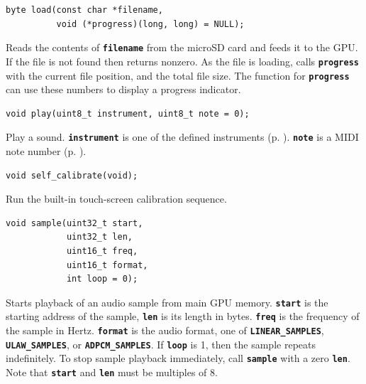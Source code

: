\documentclass[10pt]{book}
\newcommand{\mach}[1]{\texttt{\textbf{#1}}}
\begin{document}

\begin{framed}
\begin{verbatim}
byte load(const char *filename,
          void (*progress)(long, long) = NULL);
\end{verbatim}
\end{framed}

Reads the contents of \mach{filename} from the microSD card and
feeds it to the GPU.
If the file is not found then returns nonzero.
As the file is loading, calls \mach{progress} with the current file position,
and the total file size.
The function for \mach{progress} can use these numbers to display a progress indicator.


\begin{framed}
\begin{verbatim}
void play(uint8_t instrument, uint8_t note = 0);
\end{verbatim}
\end{framed}

Play a sound. \mach{instrument} is one of the defined instruments (p. \pageref{instruments}).
\mach{note} is a MIDI note number (p. \pageref{MIDI}).


\begin{framed}
\begin{verbatim}
void self_calibrate(void);
\end{verbatim}
\end{framed}

Run the built-in touch-screen calibration sequence.


\begin{framed}
\begin{verbatim}
void sample(uint32_t start,
            uint32_t len,
            uint16_t freq,
            uint16_t format,
            int loop = 0);
\end{verbatim}
\end{framed}

Starts playback of an audio sample from main GPU memory.
\mach{start} is the starting address of the sample,
\mach{len} is its length in bytes.
\mach{freq} is the frequency of the sample in Hertz.
\mach{format} is the audio format, one of
\mach{LINEAR\_SAMPLES},
\mach{ULAW\_SAMPLES}, or
\mach{ADPCM\_SAMPLES}.
If \mach{loop} is 1, then the sample repeats indefinitely.
To stop sample playback immediately, call \mach{sample} with a zero \mach{len}.
Note that \mach{start} and \mach{len} must be multiples of 8.
\end{document}
